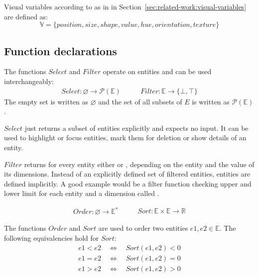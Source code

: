 Visual variables according to \textcite{Bertin2010} as in in Section~\ref{sec:related-work:visual-variables} are defined as:
\begin{equation} \mathbb{V} = \{position, size, shape, value, hue, orientation, texture\} \end{equation}


\subsection{Function declarations}
The functions $Select$ and $Filter$ operate on entities and can be used interchangeably:
\begin{equation}
\begin{split} Select: \varnothing \rightarrow \mathcal{P}(\mathbb{E}) \end{split}\qquad
\begin{split} Filter: \mathbb{E} \rightarrow \{ \bot, \top \} \end{split}
\end{equation}
  The empty set is written as $\varnothing$ and the set of all subsets of $E$ is written as $ \mathcal{P}(\mathbb{E})$.

  $Select$ just returns a subset of entities explicitly and expects no input.
  It can be used to highlight or focus entities, mark them for deletion or show details of an entity.

  $Filter$ returns for every entity either  or , depending on the entity and the value of its dimensions.
  Instead of an explicitly defined set of filtered entities, entities are defined implicitly.
  A good example would be a filter function checking upper and lower limit for each entity and a dimension called .

\begin{equation}
\begin{split} Order: \varnothing \rightarrow \mathbb{E}^* \end{split}\qquad
\begin{split} Sort:  \mathbb{E} \times \mathbb{E} \rightarrow \mathbb{R} \end{split}
\end{equation}

  The functions $Order$ and $Sort$ are used to order two entities $e1, e2 \in \mathbb{E}$.
  The following equivalencies hold for $Sort$:
  \begin{align*}
     e1 < e2 \quad\Leftrightarrow\quad Sort(e1,e2) < 0 \\
     e1 = e2 \quad\Leftrightarrow\quad Sort(e1,e2) = 0 \\
     e1 > e2 \quad\Leftrightarrow\quad Sort(e1,e2) > 0
  \end{align*}

